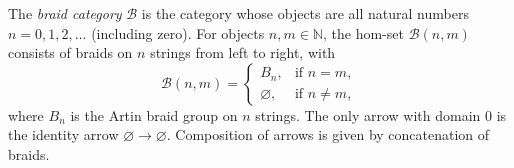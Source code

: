 The \emph{braid category} $\mathcal{B}$ is the category whose objects are all natural numbers $n = 0, 1, 2, \ldots$ (including zero). For objects $n, m \in \mathbb{N}$, the hom-set $\mathcal{B}(n, m)$ consists of braids on $n$ strings from left to right, with
$$
\mathcal{B}(n, m) = \begin{cases}
B_n, & \text{if } n = m, \\
\varnothing, & \text{if } n \neq m,
\end{cases}
$$
where $B_n$ is the Artin braid group on $n$ strings. The only arrow with domain $0$ is the identity arrow $\varnothing \to \varnothing$. Composition of arrows is given by concatenation of braids.
